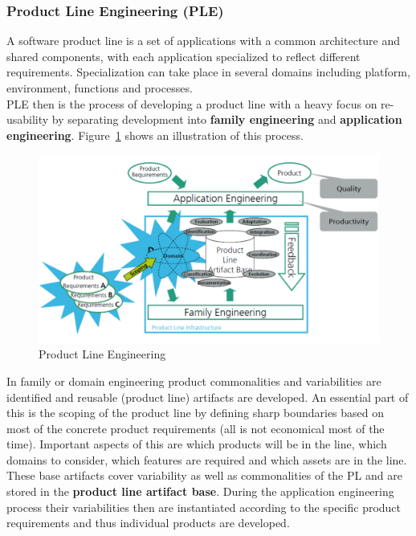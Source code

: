 \subsubsection{Product Line Engineering (PLE)}
A software product line is a set of applications with a common architecture and shared components, with each application specialized to reflect different requirements.
Specialization can take place in several domains including platform, environment, functions and processes.\\
PLE then is the process of developing a product line with a heavy focus on re-usability by separating development into \textbf{family engineering} and \textbf{application engineering}.
Figure~\ref{fig:product_line_engineering} shows an illustration of this process.
\begin{figure}[h]
  \centering
  \includegraphics[width=.7\textwidth]{images/product_line_engineering.png}
  \caption{Product Line Engineering}\label{fig:product_line_engineering}
\end{figure}
In family or domain engineering product commonalities and variabilities are identified and reusable (product line) artifacts are developed.
An essential part of this is the scoping of the product line by defining sharp boundaries based on most of the concrete product requirements (all is not economical most of the time).
Important aspects of this are which products will be in the line, which domains to consider, which features are required and which assets are in the line.
These base artifacts cover variability as well as commonalities of the PL and are stored in the \textbf{product line artifact base}.
During the application engineering process their variabilities then are instantiated according to the specific product requirements and thus individual products are developed.\\


